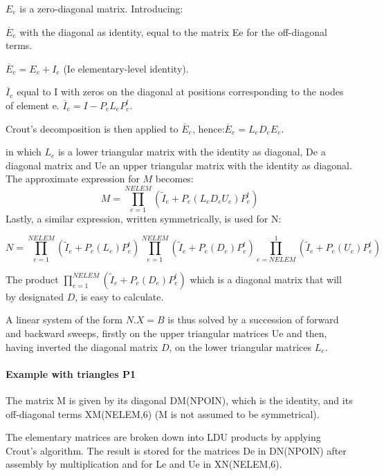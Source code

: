 $E_{e}$ is a zero-diagonal matrix. Introducing:

$\overline{E}_{e}$ with the diagonal as identity, equal to the matrix Ee for
the off-diagonal terms.

$\overline{E}_{e} =E_{e} +I_{e}$ (Ie elementary-level identity).

$\overline{I}_{e}$ equal to I with zeros on the diagonal at positions
corresponding to the nodes of element e. $\overline{I}_{e} =I-P_{e} L_{e}
P_{e}^{t} $.

Crout's decomposition is then applied to $\overline{E}_{e} $,
hence:$\overline{E}_{e} =L_{e} D_{e} E_{e} $.

in which $L_{e}$ is a lower triangular matrix with  the identity as diagonal, De a
diagonal matrix and Ue an upper triangular matrix with the identity as
diagonal. The approximate expression for $M$ becomes:
\[M=\prod _{e=1}^{NELEM}(\tilde{I}_{e} +P_{e} (L_{e} D_{e} U_{e} )P_{e}^{t} ) \]
Lastly, a similar expression, written symmetrically, is used for N:

\[N=\prod _{e=1}^{NELEM}(\tilde{I}_{e} +P_{e} (L_{e} )P_{e}^{t} ) \prod _{e=1}^{NELEM}(\tilde{I}_{e} +P_{e} (D_{e} )P_{e}^{t} ) \prod _{e=NELEM}^{1}(\tilde{I}_{e} +P_{e} (U_{e} )P_{e}^{t} ) \]

The product $\prod _{e=1}^{NELEM}(\tilde{I}_{e} +P_{e} (D_{e} )P_{e}^{t} ) $
which is a diagonal matrix that will by designated $D$, is easy to calculate.

A linear system of the form $N.X = B$ is thus solved by a succession of forward
and backward sweeps, firstly on the upper triangular matrices Ue and then,
having inverted the diagonal matrix $D$, on the lower triangular matrices $L_{e}$.

\paragraph{Example with triangles P1}

The matrix M is given by its diagonal DM(NPOIN), which is the identity, and its
off-diagonal terms XM(NELEM,6) (M is not assumed to be symmetrical).


The elementary matrices are broken down into LDU products by applying Crout's
algorithm. The result is stored for the matrices De in DN(NPOIN) after assembly
by multiplication and for Le and Ue in XN(NELEM,6).

